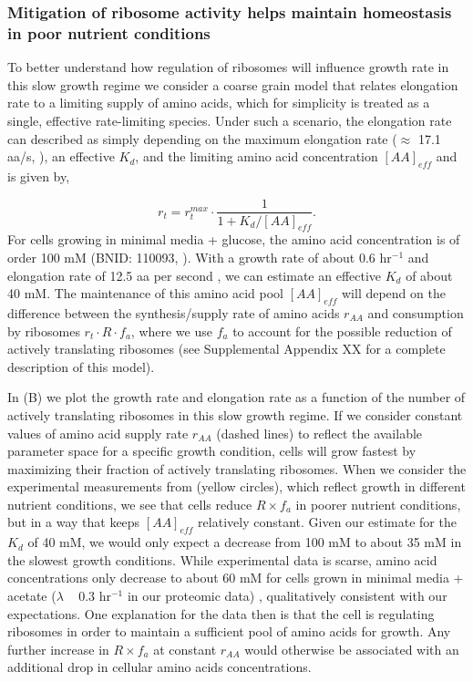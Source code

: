 \subsubsection{Mitigation of ribosome activity helps maintain homeostasis in
poor nutrient conditions}

To better understand how regulation of ribosomes will influence growth rate in
this slow growth regime  we consider a coarse grain model that relates
elongation rate to a limiting supply of amino acids, which for simplicity is
treated as a single, effective rate-limiting species. Under such a scenario, the
elongation rate can described as simply depending on the maximum elongation rate
($\approx$ 17.1 aa/s, \citep{dai2016, dai2018}), an effective $K_d$, and the
limiting amino acid concentration $[AA]_{eff}$ and is given by,

\begin{equation}
r_t = r_t^{max} \cdot \frac{1}{1 + K_d / [AA]_{eff}}.
\label{eq:rate_Kd}
\end{equation}
For cells growing in minimal media + glucose, the amino acid concentration is of
order 100 mM  (BNID: 110093, \citep{milo2010, bennett2009}). With a growth rate
of about 0.6 hr$^{-1}$ and elongation rate of 12.5 aa per second
\citep{dai2016}, we can estimate an effective $K_d$ of about 40 mM. The maintenance
of this amino acid pool $[AA]_{eff}$ will depend on the difference between
the synthesis/supply rate of amino acids $r_{AA}$ and consumption by ribosomes $r_t \cdot R
\cdot f_a$, where we use $f_a$ to account for the possible reduction of actively
translating ribosomes (see Supplemental Appendix XX for a complete
description of this model).

In (B) we plot the growth rate and elongation rate
as a function of the number of actively translating ribosomes in this slow
growth regime. If we consider constant values of amino acid supply rate $r_{AA}$
(dashed lines) to reflect the available parameter space for a specific growth
condition, cells will grow fastest by maximizing their fraction of actively
translating ribosomes. When we consider the experimental measurements from
\cite{dai2018} (yellow circles), which reflect growth in different nutrient
conditions, we see that cells reduce $R \times f_a$ in poorer nutrient
conditions, but in a way that keeps $[AA]_{eff}$ relatively constant. Given our
estimate for the $K_d$ of 40 mM,  we would only expect a decrease from 100 mM to
about 35 mM in the slowest growth conditions. While experimental data is scarse,
amino acid concentrations only decrease to about 60 mM for cells grown in
minimal media + acetate ($\lambda$ ~ 0.3 hr$^{-1}$ in our proteomic data)
\citep{bennett2009}, qualitatively consistent with our expectations.  One
explanation for the data then is that the cell is regulating ribosomes in order
to maintain a sufficient pool of amino acids for growth. Any further increase in
$R \times f_a$ at constant $r_{AA}$ would otherwise be associated with an
additional drop in cellular amino acids concentrations.


